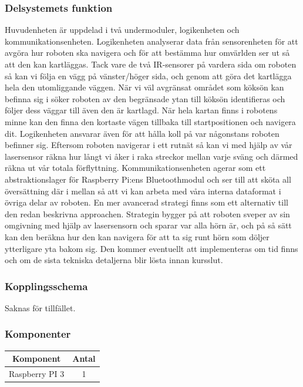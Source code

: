 \documentclass{article}
\begin{document}
\subsubsection{Delsystemets funktion}

Huvudenheten är uppdelad i två undermoduler, logikenheten och kommunikationsenheten. Logikenheten analyserar data från sensorenheten för att avgöra hur roboten ska navigera och för att bestämma hur omvärlden ser ut så att den kan kartläggas. Tack vare de två IR-sensorer på vardera sida om roboten så kan vi följa en vägg på vänster/höger sida, och genom att göra det kartlägga hela den utomliggande väggen. När vi väl avgränsat området som köksön kan befinna sig i söker roboten av den begränsade ytan till köksön identifieras och följer dess väggar till även den är kartlagd. När hela kartan finns i robotens minne kan den finna den kortaste vägen tillbaka till startpositionen och navigera dit. Logikenheten ansvarar även för att hålla koll på var någonstans roboten befinner sig. Eftersom roboten navigerar i ett rutnät så kan vi med hjälp av vår lasersensor räkna hur långt vi åker i raka streckor mellan varje sväng och därmed räkna ut vår totala förflyttning. Kommunikationsenheten agerar som ett abstraktionslager för Raspberry Pi:ens Bluetoothmodul och ser till att sköta all översättning där i mellan så att vi kan arbeta med våra interna dataformat i övriga delar av roboten.
\newline\newline
En mer avancerad strategi finns som ett alternativ till den redan beskrivna approachen. Strategin bygger på att roboten sveper av sin omgivning med hjälp av lasersensorn och sparar var alla hörn är, och på så sätt kan den beräkna hur den kan navigera för att ta sig runt hörn som döljer ytterligare yta bakom sig. Den kommer eventuellt att implementeras om tid finns och om de sista tekniska detaljerna blir lösta innan kursslut.

\subsubsection{Kopplingsschema}
Saknas för tillfället.

\subsubsection{Komponenter}

\begin{table}[H]
   \centering
  \begin{tabular}{ | c | c | }
    \hline
    \textbf{Komponent} & \textbf{Antal} \\
    \hline
    Raspberry PI 3 & 1 \\
    \hline
  \end{tabular}
\end{table}
\end{document}
